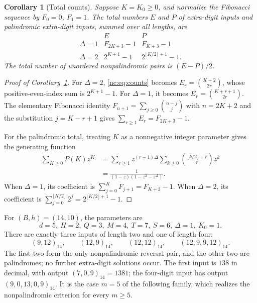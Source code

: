 \documentclass[11pt]{amsart}
\newtheorem{corollary}[theorem]{Corollary}
\theoremstyle{remark}\newtheorem{remark}[theorem]{Remark}
\begin{document}
\begin{corollary}[Total counts]\label{nc:cor:totals}
Suppose $K=K_0\ge0$, and normalize the Fibonacci sequence by $F_0=0$, $F_1=1$. The total numbers $E$ and $P$ of extra-digit inputs and palindromic extra-digit inputs, summed over all lengths, are
\[
\begin{array}{c|cc}
 & E & P\\\hline
 \Delta=1 & F_{2K+3}-1 & F_{K+3}-1\\
 \Delta=2 & 2^{K+1}-1 & 2^{\lfloor K/2\rfloor+1}-1.
\end{array}
\]
The total number of unordered nonpalindromic pairs is $(E-P)/2$.
\end{corollary}

\begin{proof}[Proof of Corollary~\ref{nc:cor:totals}]
For $\Delta=2$, \eqref{nc:eq:counts} becomes $E_r=\binom{K+2}{2r}$, whose positive-even-index sum is $2^{K+1}-1$. For $\Delta=1$, it becomes $E_r=\binom{K+r+1}{2r}$. The elementary Fibonacci identity $F_{n+1}=\sum_{j\ge0}\binom{n-j}{j}$ with $n=2K+2$ and the substitution $j=K-r+1$ gives $\sum_{r\ge1}E_r=F_{2K+3}-1$.

For the palindromic total, treating $K$ as a nonnegative integer parameter gives the generating function
\begin{align*}
 \sum_{K\ge0}P(K)z^K
 &=\sum_{r\ge1}z^{(r-1)\Delta}
   \sum_{k\ge0}\binom{\lfloor k/2\rfloor+r}{r}z^k\\
 &=\frac{1}{(1-z)(1-z^2-z^\Delta)}.
\end{align*}
When $\Delta=1$, its coefficient is $\sum_{j=0}^K F_{j+1}=F_{K+3}-1$. When $\Delta=2$, its coefficient is $\sum_{j=0}^{\lfloor K/2\rfloor}2^j=2^{\lfloor K/2\rfloor+1}-1$.
\end{proof}

For $(B,h)=(14,10)$, the parameters are
\[
 d=5,\ H=2,\ Q=3,\ M=4,\ T=7,\ S=6,\ \Delta=1,\ K_0=1.
\]
There are exactly three inputs of length two and one of length four:
\[
 (9,12)_{14},\qquad(12,9)_{14},\qquad(12,12)_{14},\qquad
 (12,9,9,12)_{14}.
\]
The first two form the only nonpalindromic reversal pair, and the other two are palindromes; no further extra-digit solutions occur. The first input is $138$ in decimal, with output $(7,0,9)_{14}=1381$; the four-digit input has output $(9,0,13,0,9)_{14}$. It is the case $m=5$ of the following family, which realizes the nonpalindromic criterion for every $m\ge5$.
\end{document}
